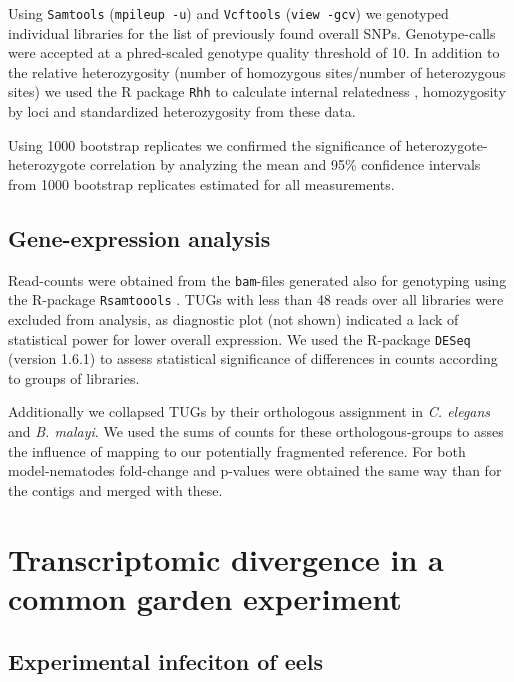 Using \texttt{Samtools} \cite{journals/bioinformatics/LiHWFRHMAD09}
(\texttt{mpileup -u}) and \texttt{Vcftools} \cite{pmid21653522}
(\texttt{view -gcv}) we genotyped individual libraries for the list of
previously found overall SNPs. Genotype-calls were accepted at a
phred-scaled genotype quality threshold of 10. In addition to the
relative heterozygosity (number of homozygous sites/number of
heterozygous sites) we used the R package \texttt{Rhh}
\cite{pmid21565077} to calculate internal relatedness
\cite{pmid11571049}, homozygosity by loci \cite{pmid17107491} and
standardized heterozygosity \cite{coltman81j} from these data.

Using 1000 bootstrap replicates we confirmed the significance of
heterozygote-heterozygote correlation by analyzing the mean and 95\%
confidence intervals from 1000 bootstrap replicates estimated for all
measurements.

\subsection*{Gene-expression analysis}

Read-counts were obtained from the \texttt{bam}-files generated also
for genotyping using the R-package \texttt{Rsamtoools}
\cite{rsamtools}. TUGs with less than 48 reads over all libraries were
excluded from analysis, as diagnostic plot (not shown) indicated a
lack of statistical power for lower overall expression. We used the
R-package \texttt{DESeq} \cite{pmid20979621} (version 1.6.1) to assess
statistical significance of differences in counts according to groups
of libraries.

Additionally we collapsed TUGs by their orthologous assignment in
\textit{C. elegans} and \textit{B. malayi}. We used the sums of counts
for these orthologous-groups to asses the influence of mapping to our
potentially fragmented reference. For both model-nematodes fold-change
and p-values were obtained the same way than for the contigs and
merged with these.


\section{Transcriptomic divergence in a common garden experiment}

\subsection{Experimental infeciton of eels} 

